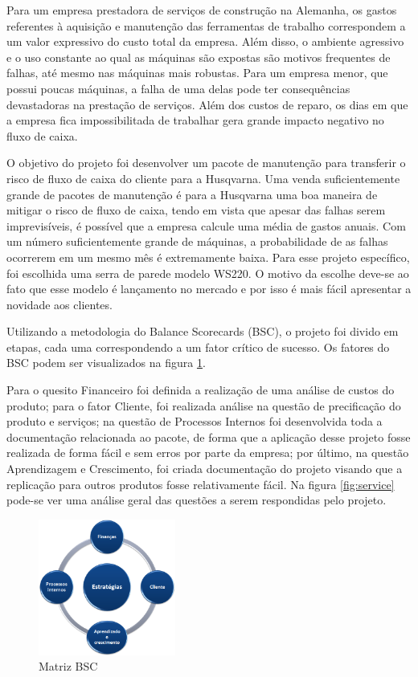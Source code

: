 \documentclass[12pt]{article}
\begin{document}
	Para um empresa prestadora de serviços de construção na Alemanha, os gastos referentes à aquisição e manutenção das ferramentas de trabalho correspondem a um valor expressivo do custo total da empresa. Além disso, o ambiente agressivo e o uso constante ao qual as máquinas são expostas são motivos frequentes de falhas, até mesmo nas máquinas mais robustas. Para um empresa menor, que possui poucas máquinas, a falha de uma delas pode ter consequências devastadoras na prestação de serviços. Além dos custos de reparo, os dias em que a empresa fica impossibilitada de trabalhar gera grande impacto negativo no fluxo de caixa.

	O objetivo do projeto foi desenvolver um pacote de manutenção para transferir o risco de fluxo de caixa do cliente para a Husqvarna. Uma venda suficientemente grande de pacotes de manutenção é para a Husqvarna uma boa maneira de mitigar o risco de fluxo de caixa, tendo em vista que apesar das falhas serem imprevisíveis, é possível que a empresa calcule uma média de gastos anuais. Com um número suficientemente grande de máquinas, a probabilidade de as falhas ocorrerem em um mesmo mês é extremamente baixa. Para esse projeto específico, foi escolhida uma serra de parede modelo WS220. O motivo da escolhe deve-se ao fato que esse modelo é lançamento no mercado e por isso é mais fácil apresentar a novidade aos clientes.

	Utilizando a metodologia do Balance Scorecards (BSC), o projeto foi divido em etapas, cada uma correspondendo a um fator crítico de sucesso. Os fatores do BSC podem ser visualizados na figura \ref{fig:bsc}. 
	
	Para o quesito Financeiro foi definida a realização de uma análise de custos do produto; para o fator Cliente, foi realizada análise na questão de precificação do produto e serviços; na questão de Processos Internos foi desenvolvida toda a documentação relacionada ao pacote, de forma que a aplicação desse projeto fosse realizada de forma fácil e sem erros por parte da empresa; por último, na questão Aprendizagem e Crescimento, foi criada documentação do projeto visando que a replicação para outros produtos fosse relativamente fácil. Na figura \ref{fig:service} pode-se ver uma análise geral das questões a serem respondidas pelo projeto.

\begin{figure}[h!]
	\centering
	\includegraphics[width=0.4\textwidth]{img/bsc.png}
	\caption{Matriz BSC}
	\label{fig:bsc}
\end{figure}
\end{document}
